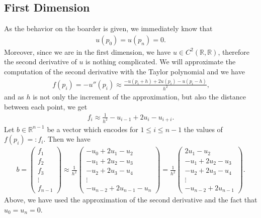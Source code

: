 \subsection{First Dimension}
As the behavior on the boarder is given, we immediately know that
\begin{align*}
    u(p_0) = u(p_n) = 0 \text{.}
\end{align*}
Moreover, since we are in the first dimension, we have \(u \in C^2(\mathbb{R}, \mathbb{R})\), therefore the second derivative of \(u\) is nothing complicated. We will approximate the computation of the second derivative with the Taylor polynomial and we have
\begin{align*}
    f(p_i) = -u''(p_i) \approx \frac{-u(p_i + h) + 2u(p_i) - u(p_i - h)}{h^2} \text{,}
\end{align*}
and as \(h\) is not only the increment of the approximation, but also the distance between each point, we get
\begin{align*}
    f_i \approx \frac{1}{h^2} -u_{i - 1} + 2u_i - u_{i + i} \text{.}
\end{align*}
Let \(b \in \mathbb{R}^{n-1}\) be a vector which encodes for \(1 \leq i \leq n-1\) the values of \(f(p_i) =: f_i\). Then we have
\begin{align*}
    b =
    \begin{pmatrix}
        f_1 \\
        f_2 \\
        f_3 \\
        \vdots \\
        f_{n-1}
    \end{pmatrix}
    \approx
    \frac{1}{h^2}
    \begin{pmatrix}
        -u_0 + 2u_1 -u_2 \\
        -u_1 + 2u_2 -u_3 \\
        -u_2 + 2u_3 -u_4 \\
        \vdots \\
        -u_{n-2} + 2u_{n-1} -u_{n}
    \end{pmatrix}
    =
    \frac{1}{h^2}
    \begin{pmatrix}
        2u_1 -u_2 \\
        -u_1 + 2u_2 -u_3 \\
        -u_2 + 2u_3 -u_4 \\
        \vdots \\
        -u_{n-2} + 2u_{n-1}
    \end{pmatrix} \text{.}
\end{align*}
Above, we have used the approximation of the second derivative and the fact that \(u_0 = u_n = 0\).

